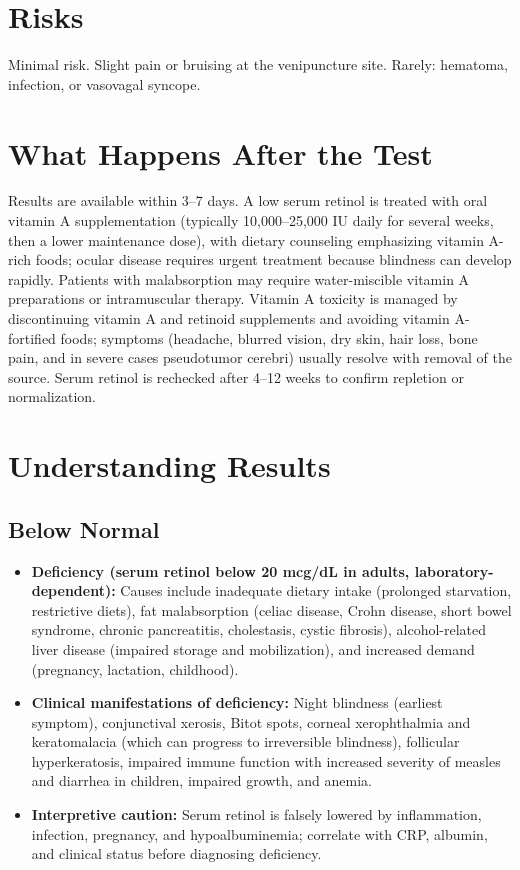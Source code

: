 \section*{Risks}
Minimal risk. Slight pain or bruising at the venipuncture site. Rarely: hematoma, infection, or vasovagal syncope.

\section*{What Happens After the Test}
Results are available within 3--7 days. A low serum retinol is treated with oral vitamin A supplementation (typically 10,000--25,000 IU daily for several weeks, then a lower maintenance dose), with dietary counseling emphasizing vitamin A-rich foods; ocular disease requires urgent treatment because blindness can develop rapidly. Patients with malabsorption may require water-miscible vitamin A preparations or intramuscular therapy. Vitamin A toxicity is managed by discontinuing vitamin A and retinoid supplements and avoiding vitamin A-fortified foods; symptoms (headache, blurred vision, dry skin, hair loss, bone pain, and in severe cases pseudotumor cerebri) usually resolve with removal of the source. Serum retinol is rechecked after 4--12 weeks to confirm repletion or normalization.

\section*{Understanding Results}

\subsection*{Below Normal}
\begin{itemize}
  \item \textbf{Deficiency (serum retinol below 20 mcg/dL in adults, laboratory-dependent):} Causes include inadequate dietary intake (prolonged starvation, restrictive diets), fat malabsorption (celiac disease, Crohn disease, short bowel syndrome, chronic pancreatitis, cholestasis, cystic fibrosis), alcohol-related liver disease (impaired storage and mobilization), and increased demand (pregnancy, lactation, childhood).
  \item \textbf{Clinical manifestations of deficiency:} Night blindness (earliest symptom), conjunctival xerosis, Bitot spots, corneal xerophthalmia and keratomalacia (which can progress to irreversible blindness), follicular hyperkeratosis, impaired immune function with increased severity of measles and diarrhea in children, impaired growth, and anemia.
  \item \textbf{Interpretive caution:} Serum retinol is falsely lowered by inflammation, infection, pregnancy, and hypoalbuminemia; correlate with CRP, albumin, and clinical status before diagnosing deficiency.
\end{itemize}

